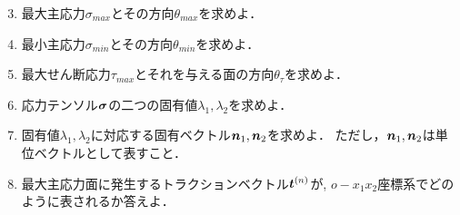 \documentclass[10pt,a4j]{jarticle}
\begin{document}
\begin{enumerate}
\setcounter{enumi}{2}
\item
	最大主応力$\sigma_{max}$とその方向$\theta_{max}$を求めよ．
\item
	最小主応力$\sigma_{min}$とその方向$\theta_{min}$を求めよ．
\item
	最大せん断応力$\tau_{max}$とそれを与える面の方向$\theta_\tau$を求めよ．
\item
	応力テンソル$\mbox{\boldmath $\sigma$}$の二つの固有値$\lambda_1,\lambda_2$を求めよ．
\item
	固有値$\lambda_1,\lambda_2$に対応する固有ベクトル$\mbox{\boldmath $n$}_1, \mbox{\boldmath $n$}_2$を求めよ．
	ただし，$\mbox{\boldmath $n$}_1,\mbox{\boldmath $n$}_2$は単位ベクトルとして表すこと．		
\item
	最大主応力面に発生するトラクションベクトル$\mbox{\boldmath $t$}^{(n)}$が, 
	$o-x_1x_2$座標系でどのように表されるか答えよ．
\end{enumerate}
\end{document}
